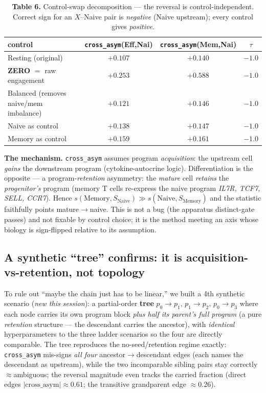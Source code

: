 \documentclass[11pt]{article}
\begin{document}
\begin{table}[h]\centering\small
\caption*{\textbf{Table 6.} Control-swap decomposition --- the reversal is control-independent.
Correct sign for an $X$--Naive pair is \emph{negative} (Naive upstream); every control gives
\emph{positive}.}
\begin{tabular}{lccc}
\toprule
control & \texttt{cross\_asym}(Eff,Nai) & \texttt{cross\_asym}(Mem,Nai) & $\tau$ \\
\midrule
Resting (original)                      & $+0.107$ & $+0.140$ & $-1.0$ \\
\rowcolor{hl}\textbf{ZERO} $=$ raw engagement & $\mathbf{+0.253}$ & $\mathbf{+0.588}$ & $-1.0$ \\
Balanced (removes naive/mem imbalance)  & $+0.121$ & $+0.146$ & $-1.0$ \\
Naive as control                        & $+0.138$ & $+0.147$ & $-1.0$ \\
Memory as control                       & $+0.159$ & $+0.161$ & $-1.0$ \\
\bottomrule
\end{tabular}
\end{table}

\textbf{The mechanism.} \texttt{cross\_asym} assumes program \emph{acquisition}: the upstream cell
\emph{gains} the downstream program (cytokine-autocrine logic). Differentiation is the opposite ---
a program-\emph{retention} asymmetry: the \emph{mature} cell \emph{retains} the \emph{progenitor's}
program (memory T cells re-express the naive program \textit{IL7R, TCF7, SELL, CCR7}). Hence
$s(\text{Memory},S_{\text{Naive}})\gg s(\text{Naive},S_{\text{Memory}})$ and the statistic
faithfully points mature$\rightarrow$naive. This is not a bug (the apparatus distinct-gate passes)
and not fixable by control choice; it is the method meeting an axis whose biology is sign-flipped
relative to its assumption.

\subsection{A synthetic ``tree'' confirms: it is acquisition-vs-retention, not topology}
To rule out ``maybe the chain just has to be linear,'' we built a 4th synthetic scenario
(\emph{new this session}): a partial-order \textbf{tree} $p_0\!\to\!p_1,\,p_1\!\to\!p_2,\,
p_0\!\to\!p_3$ where each node carries its own program block \emph{plus half its parent's full
program} (a pure \emph{retention} structure --- the descendant carries the ancestor), with
\emph{identical} hyperparameters to the three ladder scenarios so the four are directly
comparable. The tree reproduces the no-seed/retention regime exactly: \texttt{cross\_asym}
mis-signs \emph{all four} ancestor$\to$descendant edges (each names the descendant as upstream),
while the two incomparable sibling pairs stay correctly $\approx$ambiguous; the reversal magnitude
even tracks the carried fraction (direct edges $|\mathrm{cross\_asym}|\!\approx\!0.61$; the
transitive grandparent edge $\approx\!0.26$).
\end{document}
